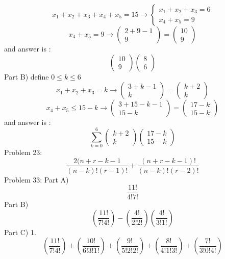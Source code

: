 \documentclass{article}
\begin{document}
	$$
	x_1+x_2+x_3+x_4+x_5=15 \rightarrow \left\lbrace\begin{array}{c}
	x_1+x_2+x_3=6\\
	x_4+x_5=9
	\end{array}	\right.
	$$
	$$
	x_4+x_5=9 \rightarrow
	\left(\begin{array}{c}
	2+9-1\\
	9
	\end{array}\right)
	=
	\left(\begin{array}{c}
	10\\
	9
	\end{array}\right)
	$$
	and answer is :
	$$
	\left(\begin{array}{c}
	10\\
	9
	\end{array}\right)
	\left(\begin{array}{c}
	8\\
	6
	\end{array}\right)
	$$
	Part B) define $0 \leq k \leq 6$
	$$
	x_1+x_2+x_3=k \rightarrow
	\left(\begin{array}{c}
	3+k-1\\
	k
	\end{array}\right)
	=
	\left(\begin{array}{c}
	k+2\\
	k
	\end{array}\right)
	$$
	$$
	x_4+x_5 \leq 15-k \rightarrow
	\left(\begin{array}{c}
	3+15-k-1\\
	15-k
	\end{array}\right)
	=
	\left(\begin{array}{c}
	17-k\\
	15-k
	\end{array}\right)
	$$
	and answer is :
	$$
	\sum_{k=0}^{6}
	\left(\begin{array}{c}
	k+2\\
	k
	\end{array}\right)
	\left(\begin{array}{c}
	17-k\\
	15-k
	\end{array}\right)
	$$
	Problem 23:
	$$
	\frac{2(n+r-k-1}{(n-k)!(r-1)!}
	+
	\frac{(n+r-k-1)!}{(n-k)!(r-2)!}
	$$
	Problem 33: Part A)
	$$
	\frac{11!}{4!7!}
	$$
	Part B)
	$$
	\left(
	\frac{11!}{7!4!}
	\right)
	-
	\left(
	\frac{4!}{2!2!}
	\right)
	\left(
	\frac{4!}{3!1!}
	\right)
	$$
	Part C) 1.
	$$
	\left(
	\frac{11!}{7!4!}
	\right)
	+
	\left(
	\frac{10!}{6!3!1!}
	\right)
	+
	\left(
	\frac{9!}{5!2!2!}
	\right)
	+
	\left(
	\frac{8!}{4!1!3!}
	\right)
	+
	\left(
	\frac{7!}{3!0!4!}
	\right)	
	$$
\end{document}
